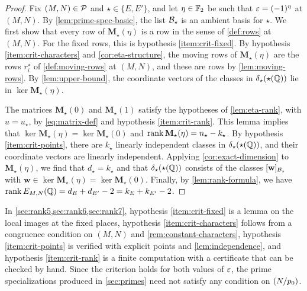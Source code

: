 \begin{proof}
Fix $(M,N)\in\mathcal P$ and $\star\in\{E,E'\}$, and let $\eta\in\mathbb F_2$ be such that $\varepsilon=(-1)^\eta$ at $(M,N)$. By \cref{lem:prime-spec-basic}, the list $\mathcal B_\star$ is an ambient basis for $\star$. We first show that every row of $\mathbf M_\star(\eta)$ is a row in the sense of \cref{def:rows} at $(M,N)$. For the fixed rows, this is hypothesis \ref{item:crit-fixed}. By hypothesis \ref{item:crit-characters} and \cref{cor:eta-structure}, the moving rows of $\mathbf M_\star(\eta)$ are the rows $r^\star_i$ of \cref{def:moving-rows} at $(M,N)$, and these are rows by \cref{lem:moving-rows}. By \cref{lem:upper-bound}, the coordinate vectors of the classes in $\delta_\star(\star(\mathbb Q))$ lie in $\ker\mathbf M_\star(\eta)$.

The matrices $\mathbf M_\star(0)$ and $\mathbf M_\star(1)$ satisfy the hypotheses of \cref{lem:eta-rank}, with $u=u_\star$, by \eqref{eq:matrix-def} and hypothesis \ref{item:crit-rank}. This lemma implies that $\ker\mathbf M_\star(\eta)=\ker\mathbf M_\star(0)$ and $\operatorname{rank}\mathbf M_\star(\eta)=n_\star-k_\star$. By hypothesis \ref{item:crit-points}, there are $k_\star$ linearly independent classes in $\delta_\star(\star(\mathbb Q))$, and their coordinate vectors are linearly independent. Applying \cref{cor:exact-dimension} to $\mathbf M_\star(\eta)$, we find that $d_\star=k_\star$ and that $\delta_\star(\star(\mathbb Q))$ consists of the classes $[\mathbf w]_{\mathcal B_\star}$ with $\mathbf w\in\ker\mathbf M_\star(\eta)=\ker\mathbf M_\star(0)$. Finally, by \cref{lem:rank-formula}, we have $\operatorname{rank} E_{M,N}(\mathbb Q)=d_E+d_{E'}-2=k_E+k_{E'}-2$.
\end{proof}

In \cref{sec:rank5,sec:rank6,sec:rank7}, hypothesis \ref{item:crit-fixed} is a lemma on the local images at the fixed places, hypothesis \ref{item:crit-characters} follows from a congruence condition on $(M,N)$ and \cref{rem:constant-characters}, hypothesis \ref{item:crit-points} is verified with explicit points and \cref{lem:independence}, and hypothesis \ref{item:crit-rank} is a finite computation with a certificate that can be checked by hand. Since the criterion holds for both values of $\varepsilon$, the prime specializations produced in \cref{sec:primes} need not satisfy any condition on $\leg N{p_0}$.
